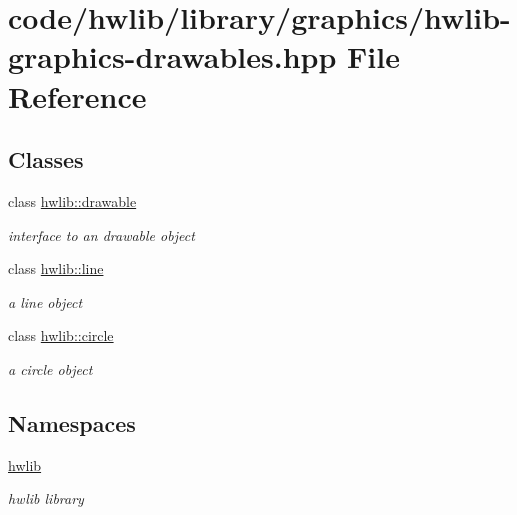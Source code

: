 \hypertarget{hwlib-graphics-drawables_8hpp}{}\section{code/hwlib/library/graphics/hwlib-\/graphics-\/drawables.hpp File Reference}
\label{hwlib-graphics-drawables_8hpp}
\subsection*{Classes}
\begin{DoxyCompactItemize}
\item 
class \hyperlink{classhwlib_1_1drawable}{hwlib\+::drawable}
\begin{DoxyCompactList}\small\item\em interface to an drawable object \end{DoxyCompactList}\item 
class \hyperlink{classhwlib_1_1line}{hwlib\+::line}
\begin{DoxyCompactList}\small\item\em a line object \end{DoxyCompactList}\item 
class \hyperlink{classhwlib_1_1circle}{hwlib\+::circle}
\begin{DoxyCompactList}\small\item\em a circle object \end{DoxyCompactList}\end{DoxyCompactItemize}
\subsection*{Namespaces}
\begin{DoxyCompactItemize}
\item 
 \hyperlink{namespacehwlib}{hwlib}
\begin{DoxyCompactList}\small\item\em hwlib library \end{DoxyCompactList}\end{DoxyCompactItemize}
